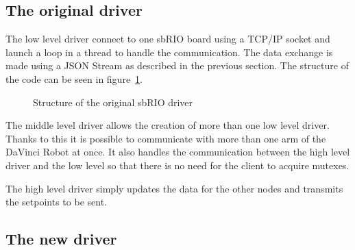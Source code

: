 \subsection{The original driver}
The low level driver connect to one sbRIO board using a TCP/IP socket and launch a loop in a thread to handle the communication. The data exchange is made using a JSON Stream as described in the previous section. The structure of the code can be seen in figure~\ref{original_driver}.

\begin{figure}
\caption{Structure of the original sbRIO driver}
\label{original_driver}
\end{figure}

The middle level driver allows the creation of more than one low level driver. Thanks to this it is possible to communicate with more than one arm of the DaVinci Robot at once. It also handles the communication between the high level driver and the low level so that there is no need for the client to acquire mutexes.

The high level driver simply updates the data for the other nodes and transmits the setpoints to be sent.

\subsection{The new driver}

